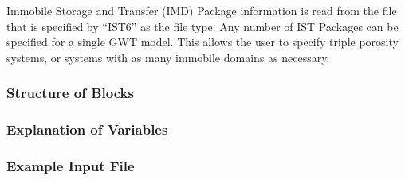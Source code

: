 Immobile Storage and Transfer (IMD) Package information is read from the file that is specified by ``IST6'' as the file type.  Any number of IST Packages can be specified for a single GWT model.  This allows the user to specify triple porosity systems, or systems with as many immobile domains as necessary. 

\vspace{5mm}
\subsubsection{Structure of Blocks}



\vspace{5mm}
\subsubsection{Explanation of Variables}
\begin{description}

\end{description}

\vspace{5mm}
\subsubsection{Example Input File}


